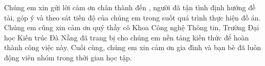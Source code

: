 \begin{acknowledgments}

Chúng em xin gửi lời cảm ơn chân thành đến \dauGVHD, người đã tận tình định
hướng đề tài, góp ý và theo sát tiến độ của chúng em trong suốt quá trình
thực hiện đồ án. Chúng em cũng xin cảm ơn quý thầy cô Khoa Công nghệ Thông
tin, Trường Đại học Kiến trúc Đà Nẵng đã trang bị cho chúng em nền tảng kiến
thức để hoàn thành công việc này. Cuối cùng, chúng em xin cảm ơn gia đình và
bạn bè đã luôn động viên nhóm trong thời gian học tập.

\vspace{1.4em}
\noindent{}\hfill
{}

\end{acknowledgments}
